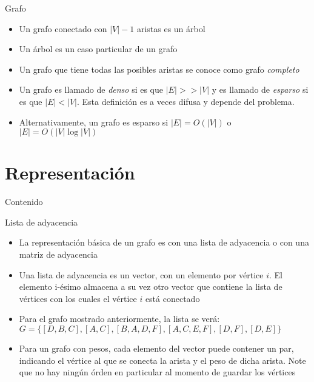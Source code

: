 \documentclass[]{beamer}
\begin{document}
\begin{frame}{Grafo}
  \begin{itemize}
    \item Un grafo conectado con $|V| - 1 $ aristas es un \'arbol
      \pause
    \item Un \'arbol es un caso particular de un grafo
      \pause
    \item Un grafo que tiene todas las posibles aristas se conoce como grafo \textit{completo}
      \pause
    \item Un grafo es llamado de \textit{denso} si es que $|E| >> |V| $ y es llamado de \textit{esparso} si es que $|E| < |V| $. Esta definici\'on es a veces difusa y depende del problema.
      \pause
    \item Alternativamente, un grafo es esparso si $|E| = O(|V|)$ o $|E| = O(|V| \log |V| )$
  \end{itemize}
\end{frame}

\section{Representaci\'on}
\begin{frame}{Contenido}
\tableofcontents[currentsection]
\end{frame}

\begin{frame}{Lista de adyacencia}
  \begin{itemize}
    \item La representaci\'on b\'asica de un grafo es con una lista de adyacencia o con una matriz de adyacencia
      \pause
    \item Una lista de adyacencia es un vector, con un elemento por v\'ertice $i$. El elemento i-\'esimo almacena a su vez otro vector que contiene la lista de v\'ertices con los cuales el v\'ertice $i$ est\'a conectado
      \pause
    \item Para el grafo mostrado anteriormente, la lista se ver\'a: $G = \{ [D, B, C], [A, C], [B, A, D, F], [A, C, E, F], [D, F], [D, E] \}$
      \pause
    \item Para un grafo con pesos, cada elemento del vector puede contener un par, indicando el v\'ertice al que se conecta la arista y el peso de dicha arista.
      Note que no hay ning\'un \'orden en particular al momento de guardar los v\'ertices
  \end{itemize}
\end{frame}
\end{document}
